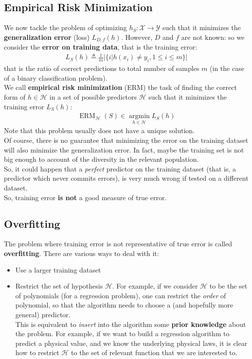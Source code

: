 \documentclass[../template.tex]{subfiles}
\begin{document}
\subsection{Empirical Risk Minimization}
We now tackle the problem of optimizing $h_S\colon \mathcal{X} \to \mathcal{Y}$ such that it minimizes the \textbf{generalization error}  (loss) $L_{D,f}(h)$. However, $D$ and $f$ are not known: so we consider the \textbf{error on training data}, that is the training error:
\begin{align*}
    L_S(h)\triangleq \frac{1}{m} |\{i | h(x_i) \neq y_i, 1\leq i \leq m\}| 
\end{align*}
that is the ratio of correct predictions to total number of samples $m$ (in the case of a binary classification problem).\\
We call \textbf{empirical risk minimization} (ERM) the task of finding the correct form of $h \in \mathcal{H}$ in a set of possible predictors $\mathcal{H}$ such that it minimizes the training error $L_S(h)$:
\begin{align*}
    \operatorname{ERM}_{\mathcal{H}}(S) \in \underset{h\in \mathcal{H}}{\operatorname{argmin}} L_S(h)
\end{align*}
Note that this problem usually does not have a unique solution.\\
Of course, there is no guarantee that minimizing the error on the training dataset will also minimize the generalization error. In fact, maybe the training set is not big enough to account of the diversity in the relevant population.\\
So, it could happen that a \textit{perfect} predictor on the training dataset (that is, a predictor which never commits errors), is very much wrong if tested on a different dataset.\\
So, training error \textbf{is not} a good measure of true error.

\subsection{Overfitting}
The problem where training error is not representative of true error is called \textbf{overfitting}. There are various ways to deal with it:
\begin{itemize}
    \item Use a larger training dataset
    \item Restrict the set of hypothesis $\mathcal{H}$. For example, if we consider $\mathcal{H}$ to be the set of polynomials (for a regression problem), one can restrict the \textit{order} of polynomial, so that the algorithm needs to choose a  (and hopefully more general) predictor.\\
    This is equivalent to \textit{insert} into the algorithm some \textbf{prior knowledge} about the problem. For example, if we want to build a regression algorithm to predict a physical value, and we know the underlying physical laws, it is clear how to restrict $\mathcal{H}$ to the set of relevant function that we are interested to.
\end{itemize}
\end{document}

